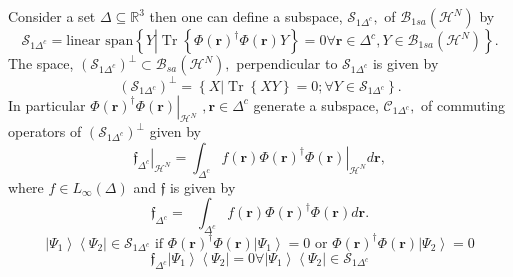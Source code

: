 \documentclass[aps,preprint]{revtex4}%
\begin{document}
Consider a set $\Delta\subseteq\mathbb{R}^{3}$ then one can define a subspace,
$\mathcal{S}_{1\Delta^{c}},$ of $\mathcal{B}_{1sa}\left(  \mathcal{H}%
^{N}\right)  $ by
\begin{equation}
\mathcal{S}_{1\Delta^{c}}=\text{linear span}\left\{  Y\left\vert
\operatorname*{Tr}\left\{  \Phi\left(  \boldsymbol{r}\right)  ^{\dagger}%
\Phi\left(  \boldsymbol{r}\right)  Y\right\}  =0\forall\boldsymbol{r}\in
\Delta^{c}\right.  ,Y\in\mathcal{B}_{1sa}\left(  \mathcal{H}^{N}\right)
\right\}  .
\end{equation}
The space, $\left(  \mathcal{S}_{1\Delta^{c}}\right)  ^{\bot}\subset
\mathcal{B}_{sa}\left(  \mathcal{H}^{N}\right)  ,$ perpendicular to
$\mathcal{S}_{1\Delta^{c}}$ is given by
\begin{equation}
\left(  \mathcal{S}_{1\Delta^{c}}\right)  ^{\bot}=\left\{  X\left\vert
\operatorname*{Tr}\left\{  XY\right\}  =0;\forall Y\in\mathcal{S}_{1\Delta
^{c}}\right.  \right\}  .
\end{equation}
In particular $\left.  \Phi\left(  \boldsymbol{r}\right)  ^{\dagger}%
\Phi\left(  \boldsymbol{r}\right)  \right\vert _{\mathcal{H}^{N}}$
$,\boldsymbol{r}\in\Delta^{c}$ generate a subspace, $\mathcal{C}_{1\Delta^{c}%
},$ of commuting operators of $\left(  \mathcal{S}_{1\Delta^{c}}\right)
^{\bot}$ given by
\begin{equation}
\left.  \mathfrak{f}_{\Delta^{c}}\right\vert _{\mathcal{H}^{N}}=\int%
_{\Delta^{c}}f\left(  \boldsymbol{r}\right)  \left.  \Phi\left(
\boldsymbol{r}\right)  ^{\dagger}\Phi\left(  \boldsymbol{r}\right)
\right\vert _{\mathcal{H}^{N}}d\boldsymbol{r},
\end{equation}
where $f\in L_{\infty}\left(  \Delta\right)  $ and $\mathfrak{f}$ is given by
\begin{equation}
\mathfrak{f}_{\Delta^{c}}=\text{ }\int_{\Delta^{c}}f\left(  \boldsymbol{r}%
\right)  \Phi\left(  \boldsymbol{r}\right)  ^{\dagger}\Phi\left(
\boldsymbol{r}\right)  d\boldsymbol{r}.
\end{equation}%
\begin{equation}
\left\vert \Psi_{1}\right\rangle \left\langle \Psi_{2}\right\vert
\in\mathcal{S}_{1\Delta^{c}}\text{ if }\Phi\left(  \boldsymbol{r}\right)
^{\dagger}\Phi\left(  \boldsymbol{r}\right)  \left\vert \Psi_{1}\right\rangle
=0\text{ or }\Phi\left(  \boldsymbol{r}\right)  ^{\dagger}\Phi\left(
\boldsymbol{r}\right)  \left\vert \Psi_{2}\right\rangle =0
\end{equation}%
\begin{equation}
\mathfrak{f}_{\Delta^{c}}\left\vert \Psi_{1}\right\rangle \left\langle
\Psi_{2}\right\vert =0\forall\left\vert \Psi_{1}\right\rangle \left\langle
\Psi_{2}\right\vert \in\mathcal{S}_{1\Delta^{c}}%
\end{equation}%
\end{document}
